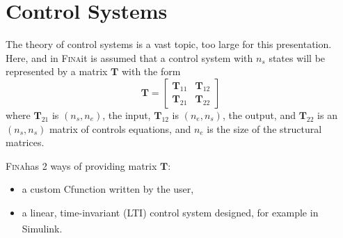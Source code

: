 \documentclass[10pt,openany,twoside]{book}
\numberwithin{equation}{section}   %
\def\Cpp{{C\nolinebreak[4]\hspace{-.05em}\raisebox{.4ex}{\tiny\bf ++}}\:}
\newcommand{\Fina}{{\normalfont\scshape Fina\:}}
\newcommand{\Simulink}{{\footnotesize{Simulink\textsuperscript{\textregistered}}\:}}
\newcommand{\Matrix}[1]{\boldsymbol{#1}}
\begin{document}
\chapter{Control Systems}\label{chap:controls}
The theory of control systems is a vast topic, too large for
this presentation. Here, and in \Fina it is assumed that a control
system with $n_s$ states will be represented by a matrix
$\Matrix{T}$ with the form
	\begin{equation}
		\Matrix{T} = \left[ \begin{array}{cc}
			\Matrix{T}_{11}      & \Matrix{T}_{12}   \\
			\Matrix{T}_{21}  &  \Matrix{T}_{22}		\nonumber
		\end{array} \right]
\end{equation}
where
$\Matrix{T}_{21}$ 
is $(n_s,n_e)$, the input,
$\Matrix{T}_{12}$ 
is $(n_e,n_s)$, the output, and
$\Matrix{T}_{22}$ is an $(n_s,n_s)$ matrix of controls equations,
and $n_e$ is the size of the structural matrices.

\Fina has 2 ways of providing matrix $\Matrix{T}$:
\begin{itemize}
	\item a custom \Cpp function written by the user,
	\item a linear, time-invariant (LTI) control system designed, for
		example in \Simulink.
\end{itemize}
\end{document}
